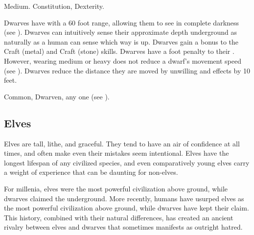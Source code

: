          Medium.
          Constitution,  Dexterity.
        \begin{raggeditemize}
             Dwarves have  with a 60 foot range, allowing them to see in complete darkness (see ).
             Dwarves can intuitively sense their approximate depth underground as naturally as a human can sense which way is up.
             Dwarves gain a  bonus to the Craft (metal) and Craft (stone) skills.
             Dwarves have a  foot penalty to their .
                However, wearing medium or heavy  does not reduce a dwarf's movement speed (see ).
             Dwarves reduce the distance they are moved by unwilling  and  effects by 10 feet.
        \end{raggeditemize}
         Common, Dwarven, any one  (see ).

    \subsection{Elves}

        Elves are tall, lithe, and graceful.
        They tend to have an air of confidence at all times, and often make even their mistakes seem intentional.
        Elves have the longest lifespan of any civilized species, and even comparatively young elves carry a weight of experience that can be daunting for non-elves.

        For millenia, elves were the most powerful civilization above ground, while dwarves claimed the underground.
        More recently, humans have usurped elves as the most powerful civilization above ground, while dwarves have kept their claim.
        This history, combined with their natural differences, has created an ancient rivalry between elves and dwarves that sometimes manifests as outright hatred.

